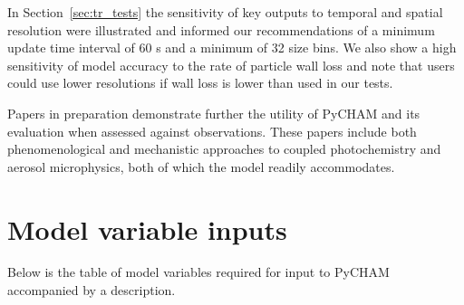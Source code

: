 \documentclass[gmd, manuscript]{copernicus}
\begin{document}
In Section~\ref{sec:tr_tests} the sensitivity of key outputs to temporal and spatial resolution were illustrated and informed our recommendations of a minimum update time interval of 60 s and a minimum of 32 size bins.  We also show a high sensitivity of model accuracy to the rate of particle wall loss and note that users could use lower resolutions if wall loss is lower than used in our tests.

Papers in preparation demonstrate further the utility of PyCHAM and its evaluation when assessed against observations.  These papers include both phenomenological and mechanistic approaches to coupled photochemistry and aerosol microphysics, both of which the model readily accommodates.



\appendix
\section{Model variable inputs}\label{sec:appA}    %

Below is the table of model variables required for input to PyCHAM accompanied by a description. 
\end{document}
